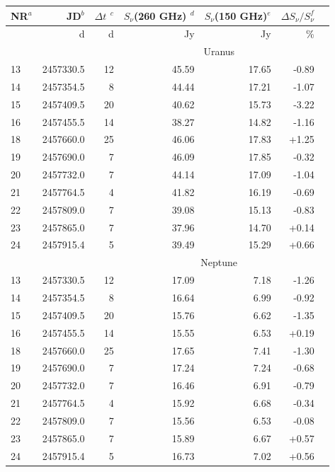 \begin{table}
\centering
\begin{tabular}{|l|r|r|r|r|r|r|}
\hline
NR$^{a}$  & JD$^{b}$ & $\Delta t$ $^{c}$ & $S_{\nu}$(260 GHz)  $^{d}$& $S_{\nu}$(150  GHz)$^{e}$  & $\Delta S_{\nu}/  S_{\nu} ^{f}$  \\
\hline
         & d  &  d        & Jy               & Jy                 &                                                                    \%  \\
\hline
         &    &            & \multicolumn{3}{|c|}{Uranus}\\
\hline
13 & 2457330.5 &  12 & 45.59 & 17.65 & -0.89\\
14 & 2457354.5 &  8 & 44.44 & 17.21 & -1.07\\
15 & 2457409.5 &  20 & 40.62 & 15.73 & -3.22\\
16 & 2457455.5 &  14 & 38.27 & 14.82 & -1.16\\
18 & 2457660.0 &  25 & 46.06 & 17.83 & +1.25\\
19 & 2457690.0 &  7 & 46.09 & 17.85 & -0.32\\
20 & 2457732.0 &  7 & 44.14 & 17.09 & -1.04\\
21 & 2457764.5 &  4 & 41.82 & 16.19 & -0.69\\
22 & 2457809.0 &  7 & 39.08 & 15.13 & -0.83\\
23 & 2457865.0 &  7 & 37.96 & 14.70 & +0.14\\
24 & 2457915.4 &  5 &  39.49 & 15.29 & +0.66 \\
\hline
         &    &            & \multicolumn{3}{|c|}{Neptune}\\
\hline
13 & 2457330.5 &  12 & 17.09 & 7.18 & -1.26\\
14 & 2457354.5 &  8 & 16.64 & 6.99 & -0.92\\
15 & 2457409.5 &  20 & 15.76 & 6.62 & -1.35\\
16 & 2457455.5 &  14 & 15.55 & 6.53 & +0.19\\
18 & 2457660.0 &  25 & 17.65 & 7.41 & -1.30\\
19 & 2457690.0 &  7 & 17.24 & 7.24 & -0.68\\
20 & 2457732.0 &  7 & 16.46 & 6.91 & -0.79\\
21 & 2457764.5 &  4 & 15.92 & 6.68 & -0.34\\
22 & 2457809.0 &  7 & 15.56 & 6.53 & -0.08\\
23 & 2457865.0 &  7 & 15.89 & 6.67 & +0.57\\
24 & 2457915.4 &  5 & 16.73 & 7.02 & +0.56 \\

\end{tabular}
\end{table}
